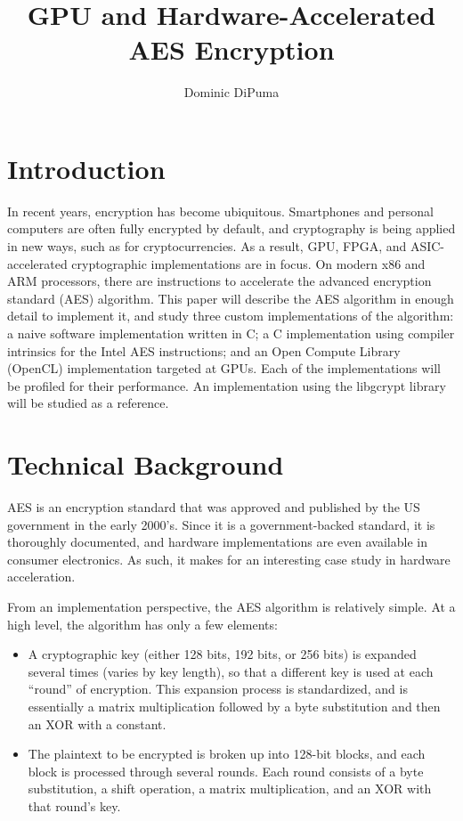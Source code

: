 \documentclass[a4paper,10pt]{article}
\title{GPU and Hardware-Accelerated AES Encryption}
\author{Dominic DiPuma}
\begin{document}
\maketitle

\section{Introduction}

In recent years, encryption has become ubiquitous.  Smartphones and personal computers are often fully encrypted by default, and cryptography is being applied in new ways, such as for cryptocurrencies.  As a result, GPU, FPGA, and ASIC-accelerated cryptographic implementations are in focus.  On modern x86 and ARM processors, there are instructions to accelerate the advanced encryption standard (AES) algorithm.  This paper will describe the AES algorithm in enough detail to implement it, and study three custom implementations of the algorithm: a naive software implementation written in C; a C implementation using compiler intrinsics for the Intel AES instructions; and an Open Compute Library (OpenCL) implementation targeted at GPUs.  Each of the implementations will be profiled for their performance.  An implementation using the libgcrypt library will be studied as a reference.

\section{Technical Background}

AES is an encryption standard that was approved and published by the US government in the early 2000's.  Since it is a government-backed standard, it is thoroughly documented, and hardware implementations are even available in consumer electronics.  As such, it makes for an interesting case study in hardware acceleration.

From an implementation perspective, the AES algorithm is relatively simple.  At a high level, the algorithm has only a few elements:
\begin{itemize}
 \item A cryptographic key (either 128 bits, 192 bits, or 256 bits) is expanded several times (varies by key length), so that a different key is used at each ``round'' of encryption.  This expansion process is standardized, and is essentially a matrix multiplication followed by a byte substitution and then an XOR with a constant.
 \item The plaintext to be encrypted is broken up into 128-bit blocks, and each block is processed through several rounds.  Each round consists of a byte substitution, a shift operation, a matrix multiplication, and an XOR with that round's key.
\end{itemize}
\end{document}
